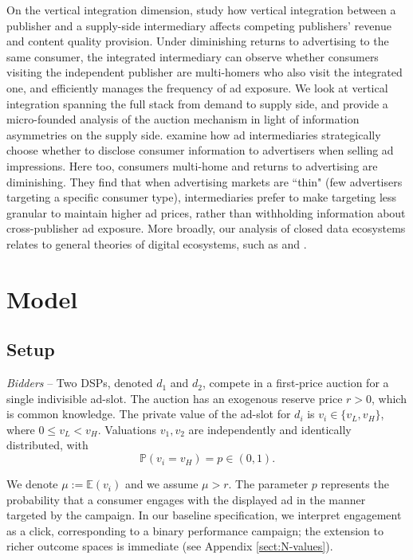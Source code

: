 \noindent On the vertical integration dimension, \textcite{dannunzioDigitalEcosystemsAdtech2024} study how vertical integration between a publisher and a supply-side intermediary affects competing publishers' revenue and content quality provision. Under diminishing returns to advertising to the same consumer, the integrated intermediary can observe whether consumers visiting the independent publisher are multi-homers who also visit the integrated one, and efficiently manages the frequency of ad exposure. We look at vertical integration spanning the full stack from demand to supply side, and provide a micro-founded analysis of the auction mechanism in light of information asymmetries on the supply side. \textcite{dannunzioIntermediariesOnlineAdvertising2024} examine how ad intermediaries strategically choose whether to disclose consumer information to advertisers when selling ad impressions. Here too, consumers multi-home and returns to advertising are diminishing. They find that when advertising markets are ``thin" (few advertisers targeting a specific consumer type), intermediaries prefer to make targeting less granular to maintain higher ad prices, rather than withholding information about cross-publisher ad exposure. More broadly, our analysis of closed data ecosystems relates to general theories of digital ecosystems, such as \textcite{rhodesDigitalEcosystemsData2024} and \textcite{heidhuesTheoryDigitalEcosystems2024}. \par

\section{Model}\label{baseline-model}
\subsection{Setup}

\noindent \textit{Bidders} -- Two DSPs, denoted $ d_1 $ and $ d_2 $, compete in a first-price auction for a single indivisible ad-slot. The auction has an exogenous reserve price $ r > 0 $, which is common knowledge. The private value of the ad-slot for $ d_i $ is $ v_i \in \{ v_L, v_H \} $, where $ 0 \leq v_L < v_H $. Valuations $ v_1, v_2 $ are independently and identically distributed, with
\begin{equation*}
 \mathbb{P}(v_i = v_H) = p \in (0,1).
\end{equation*}

\noindent We denote $ \mu := \mathbb{E}(v_i) $ and we assume $ \mu > r$. The parameter $ p $ represents the probability that a consumer engages with the displayed ad in the manner targeted by the campaign. In our baseline specification, we interpret engagement as a click, corresponding to a binary performance campaign; the extension to richer outcome spaces is immediate (see Appendix \ref{sect:N-values}). \\

